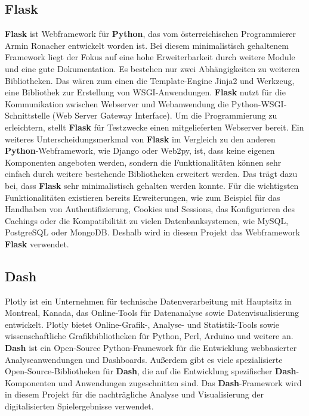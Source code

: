\subsection{Flask}
\textbf{Flask} ist Webframework für \textbf{Python}, das vom österreichischen Programmierer Armin Ronacher entwickelt worden ist.
Bei diesem minimalistisch gehaltenem Framework liegt der Fokus auf eine hohe Erweiterbarkeit durch weitere Module und eine gute Dokumentation.
Es bestehen nur zwei Abhängigkeiten zu weiteren Bibliotheken. Das wären zum einen die Template-Engine Jinja2 und Werkzeug, eine Bibliothek zur Erstellung
von WSGI-Anwendungen. \textbf{Flask} nutzt für die Kommunikation zwischen Webserver und Webanwendung die Python-WSGI-Schnittstelle (Web Server Gateway Interface).
Um die Programmierung zu erleichtern, stellt \textbf{Flask} für Testzwecke einen mitgelieferten Webserver bereit. Ein weiteres Unterscheidungsmerkmal von \textbf{Flask}
im Vergleich zu den anderen \textbf{Python}-Webframework, wie Django oder Web2py, ist, dass keine eigenen Komponenten angeboten werden, sondern die Funktionalitäten können
sehr einfach durch weitere bestehende Bibliotheken erweitert werden. Das trägt dazu bei, dass \textbf{Flask} sehr minimalistisch gehalten werden konnte.
Für die wichtigsten Funktionalitäten existieren bereits Erweiterungen, wie zum Beispiel für das Handhaben von Authentifizierung, Cookies und Sessions, das Konfigurieren
des Cachings oder die Kompatibilität zu vielen Datenbanksystemen, wie MySQL, PostgreSQL oder MongoDB.
Deshalb wird in diesem Projekt das Webframework \textbf{Flask} verwendet.

\subsection{Dash} \label{sec:dash}
Plotly ist ein Unternehmen für technische Datenverarbeitung mit Hauptsitz in Montreal, Kanada, das Online-Tools für Datenanalyse sowie Datenvisualisierung entwickelt.
Plotly bietet Online-Grafik-, Analyse- und Statistik-Tools sowie wissenschaftliche Grafikbibliotheken für Python, Perl, Arduino und weitere an.
\textbf{Dash} ist ein Open-Source Python-Framework für die Entwicklung webbasierter Analyseanwendungen und Dashboards.
Außerdem gibt es viele spezialisierte Open-Source-Bibliotheken für \textbf{Dash}, die auf die Entwicklung spezifischer \textbf{Dash}-Komponenten und  Anwendungen zugeschnitten sind. Das \textbf{Dash}-Framework wird in diesem Projekt für die nachträgliche Analyse und Visualisierung der digitalisierten Spielergebnisse verwendet.
